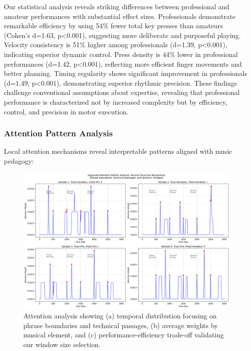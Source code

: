 \documentclass[sigconf,review,anonymous]{acmart}
\begin{document}
Our statistical analysis reveals striking differences between professional and amateur performances with substantial effect sizes. Professionals demonstrate remarkable efficiency by using 54\% fewer total key presses than amateurs (Cohen's d=1.63, p<0.001), suggesting more deliberate and purposeful playing. Velocity consistency is 51\% higher among professionals (d=1.39, p<0.001), indicating superior dynamic control. Press density is 44\% lower in professional performances (d=1.42, p<0.001), reflecting more efficient finger movements and better planning. Timing regularity shows significant improvement in professionals (d=1.49, p<0.001), demonstrating superior rhythmic precision. These findings challenge conventional assumptions about expertise, revealing that professional performance is characterized not by increased complexity but by efficiency, control, and precision in motor execution.

\subsubsection{Attention Pattern Analysis}

Local attention mechanisms reveal interpretable patterns aligned with music pedagogy:

\begin{figure}[h]
\centering
\includegraphics[width=\columnwidth]{figures/attention_analysis_improved.png}
\caption{Attention analysis showing (a) temporal distribution focusing on phrase boundaries and technical passages, (b) average weights by musical element, and (c) performance-efficiency trade-off validating our window size selection.}
\label{fig:attention}
\end{figure}
\end{document}
